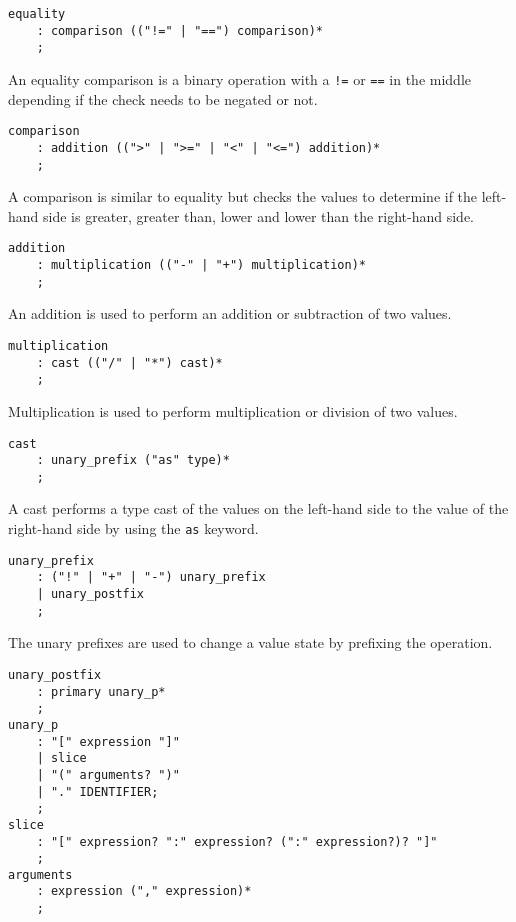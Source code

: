 \begin{lstlisting}
equality
    : comparison (("!=" | "==") comparison)*
    ;
\end{lstlisting}

An equality comparison is a binary operation with a \texttt{!=} or \texttt{==} in the middle depending if the check needs to be negated or not.

\begin{lstlisting}
comparison
    : addition ((">" | ">=" | "<" | "<=") addition)*
    ;
\end{lstlisting}

A comparison is similar to equality but checks the values to determine if the left-hand side is greater, greater than, lower and lower than the
right-hand side.

\begin{lstlisting}
addition
    : multiplication (("-" | "+") multiplication)*
    ;
\end{lstlisting}

An addition is used to perform an addition or subtraction of two values.

\begin{lstlisting}
multiplication
    : cast (("/" | "*") cast)*
    ;
\end{lstlisting}

Multiplication is used to perform multiplication or division of two values.

\begin{lstlisting}
cast
    : unary_prefix ("as" type)*
    ;
\end{lstlisting}

A cast performs a type cast of the values on the left-hand side to the value of the right-hand side by using the \texttt{as} keyword.

\begin{lstlisting}
unary_prefix
    : ("!" | "+" | "-") unary_prefix
    | unary_postfix
    ;
\end{lstlisting}

The unary prefixes are used to change a value state by prefixing the operation.

\clearpage

\begin{lstlisting}
unary_postfix
    : primary unary_p*
    ;
unary_p
    : "[" expression "]"
    | slice
    | "(" arguments? ")"
    | "." IDENTIFIER;
    ;
slice
    : "[" expression? ":" expression? (":" expression?)? "]"
    ;
arguments
    : expression ("," expression)*
    ;
\end{lstlisting}

